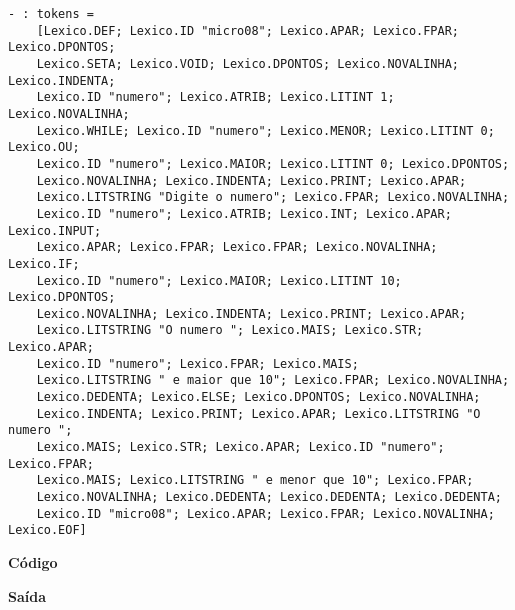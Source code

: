 \documentclass[hidelinks,12pt]{article}
\begin{document}
	\begin{lstlisting}[caption=Analisador Léxico]
	- : tokens =
	[Lexico.DEF; Lexico.ID "micro08"; Lexico.APAR; Lexico.FPAR; Lexico.DPONTOS;
	Lexico.SETA; Lexico.VOID; Lexico.DPONTOS; Lexico.NOVALINHA; Lexico.INDENTA;
	Lexico.ID "numero"; Lexico.ATRIB; Lexico.LITINT 1; Lexico.NOVALINHA;
	Lexico.WHILE; Lexico.ID "numero"; Lexico.MENOR; Lexico.LITINT 0; Lexico.OU;
	Lexico.ID "numero"; Lexico.MAIOR; Lexico.LITINT 0; Lexico.DPONTOS;
	Lexico.NOVALINHA; Lexico.INDENTA; Lexico.PRINT; Lexico.APAR;
	Lexico.LITSTRING "Digite o numero"; Lexico.FPAR; Lexico.NOVALINHA;
	Lexico.ID "numero"; Lexico.ATRIB; Lexico.INT; Lexico.APAR; Lexico.INPUT;
	Lexico.APAR; Lexico.FPAR; Lexico.FPAR; Lexico.NOVALINHA; Lexico.IF;
	Lexico.ID "numero"; Lexico.MAIOR; Lexico.LITINT 10; Lexico.DPONTOS;
	Lexico.NOVALINHA; Lexico.INDENTA; Lexico.PRINT; Lexico.APAR;
	Lexico.LITSTRING "O numero "; Lexico.MAIS; Lexico.STR; Lexico.APAR;
	Lexico.ID "numero"; Lexico.FPAR; Lexico.MAIS;
	Lexico.LITSTRING " e maior que 10"; Lexico.FPAR; Lexico.NOVALINHA;
	Lexico.DEDENTA; Lexico.ELSE; Lexico.DPONTOS; Lexico.NOVALINHA;
	Lexico.INDENTA; Lexico.PRINT; Lexico.APAR; Lexico.LITSTRING "O numero ";
	Lexico.MAIS; Lexico.STR; Lexico.APAR; Lexico.ID "numero"; Lexico.FPAR;
	Lexico.MAIS; Lexico.LITSTRING " e menor que 10"; Lexico.FPAR;
	Lexico.NOVALINHA; Lexico.DEDENTA; Lexico.DEDENTA; Lexico.DEDENTA;
	Lexico.ID "micro08"; Lexico.APAR; Lexico.FPAR; Lexico.NOVALINHA; Lexico.EOF]
	\end{lstlisting}
	
	
	{\large \textbf{Código} }
			
	
	{\large \textbf{Saída}}
	
\end{document}

